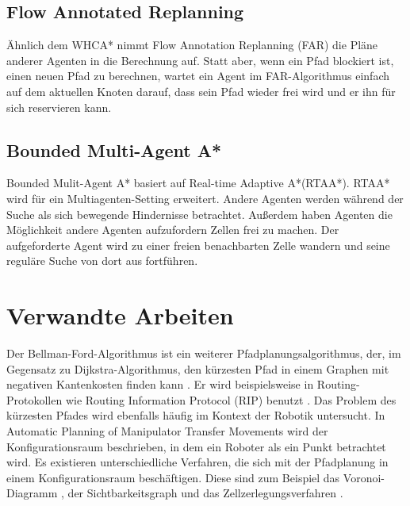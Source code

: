 \subsection{Flow Annotated Replanning}
Ähnlich dem WHCA* nimmt Flow Annotation Replanning (FAR) die Pläne anderer Agenten in die Berechnung auf. Statt aber, wenn ein Pfad blockiert ist, einen neuen Pfad zu berechnen, wartet ein Agent im FAR-Algorithmus einfach auf dem aktuellen Knoten darauf, dass sein Pfad wieder frei wird und er ihn für sich reservieren kann.

\subsection{Bounded Multi-Agent A*}
Bounded Mulit-Agent A* basiert auf Real-time Adaptive A*(RTAA*). RTAA* wird für ein Multiagenten-Setting erweitert. Andere Agenten werden während der Suche als sich bewegende Hindernisse betrachtet. Außerdem haben Agenten die Möglichkeit andere Agenten aufzufordern Zellen frei zu machen. Der aufgeforderte Agent wird zu einer freien benachbarten Zelle wandern und seine reguläre Suche von dort aus fortführen\cite{Sigurdson.2019}.

\section{Verwandte Arbeiten}

\begin{sloppypar}
	
Der Bellman-Ford-Algorithmus ist ein weiterer Pfadplanungsalgorithmus, der, im Gegensatz zu Dijkstra-Algorithmus, den kürzesten Pfad in einem Graphen mit negativen Kantenkosten finden kann \cite{Bel58}. Er wird beispielsweise in Routing-Protokollen wie Routing Information Protocol (RIP) benutzt \cite{Hed88}.
Das Problem des kürzesten Pfades wird ebenfalls häufig im Kontext der Robotik untersucht. In Automatic Planning of Manipulator Transfer Movements \cite{LP80} wird der Konfigurationsraum beschrieben, in dem ein Roboter als ein Punkt betrachtet wird. Es existieren unterschiedliche Verfahren, die sich mit der Pfadplanung in einem Konfigurationsraum beschäftigen. Diese sind zum Beispiel das Voronoi-Diagramm \cite{Lee82}, der Sichtbarkeitsgraph \cite{LPAW79} und das Zellzerlegungsverfahren \cite{Cai09} .
\end{sloppypar}
